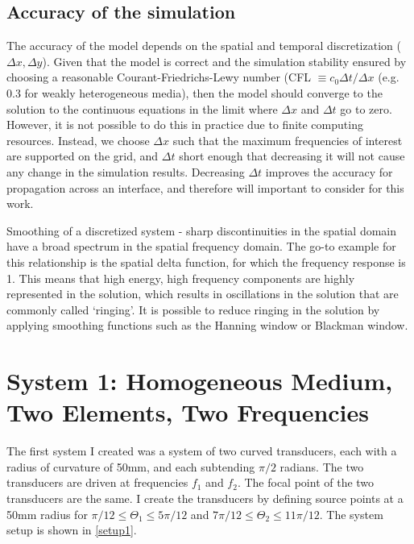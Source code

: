 \documentclass[10pt,a4paper]{article}
\begin{document}
\subsection*{Accuracy of the simulation}

The accuracy of the model depends on the spatial and temporal discretization ($\Delta x, \Delta y$). Given that the model is correct and the simulation stability ensured by choosing a reasonable Courant-Friedrichs-Lewy number (CFL $\equiv c_0 \Delta t /\Delta x$ (e.g. 0.3 for weakly heterogeneous media), then the model should converge to the solution to the continuous equations in the limit where $\Delta x$ and $\Delta t$ go to zero. However, it is not possible to do this in practice due to finite computing resources. Instead, we choose $\Delta x$ such that the maximum frequencies of interest are supported on the grid, and $\Delta t$ short enough that decreasing it will not cause any change in the simulation results. Decreasing $\Delta t$ improves the accuracy for propagation across an interface, and therefore will important to consider for this work. 

Smoothing of a discretized system - sharp discontinuities in the spatial domain have a broad spectrum in the spatial frequency domain. The go-to example for this relationship is the spatial delta function, for which the frequency response is 1. This means that high energy, high frequency components are highly represented in the solution, which results in oscillations in the solution that are commonly called `ringing'. It is possible to reduce ringing in the solution by applying smoothing functions such as the Hanning window or Blackman window. 
\section*{System 1: Homogeneous Medium, Two Elements, Two Frequencies}

The first system I created was a system of two curved transducers, each with a radius of curvature of 50mm, and each subtending $\pi/2$ radians. The two transducers are driven at frequencies $f_1$ and $f_2$. The focal point of the two transducers are the same. I create the transducers by defining source points at a 50mm radius for $\pi/12 \leq \Theta_1 \leq 5\pi/12$ and $7\pi/12 \leq \Theta_2 \leq 11 \pi/12$. The system setup is shown in \autoref{setup1}.
\end{document}
